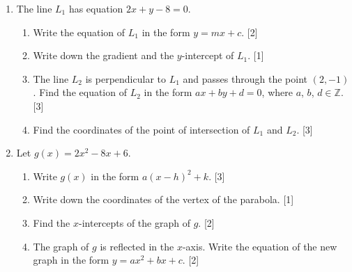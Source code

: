 \documentclass[12pt, twoside]{article}
\begin{document}
\begin{enumerate}[itemsep=0.2cm]
\newpage

\item The line $L_1$ has equation $2x + y - 8 = 0$.

\begin{enumerate}[itemsep=0.15cm]
  \item Write the equation of $L_1$ in the form $y = mx + c$. \hfill [2]
  \item Write down the gradient and the $y$-intercept of $L_1$. \hfill [1]
  \item The line $L_2$ is perpendicular to $L_1$ and passes through the
        point $(2, -1)$. Find the equation of $L_2$ in the form
        $ax + by + d = 0$, where $a$, $b$, $d \in \mathbb{Z}$. \hfill [3]
  \item Find the coordinates of the point of intersection of $L_1$
        and $L_2$. \hfill [3]
\end{enumerate}


\newpage

\item Let $g(x) = 2x^2 - 8x + 6$.

\begin{enumerate}[itemsep=0.15cm]
  \item Write $g(x)$ in the form $a(x - h)^2 + k$. \hfill [3]
  \item Write down the coordinates of the vertex of the parabola. \hfill [1]
  \item Find the $x$-intercepts of the graph of $g$. \hfill [2]
  \item The graph of $g$ is reflected in the $x$-axis. Write the equation
        of the new graph in the form $y = ax^2 + bx + c$. \hfill [2]
\end{enumerate}


\end{enumerate}
\end{document}
